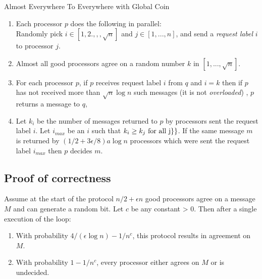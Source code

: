 \documentclass{sig-alternate}
\begin{document}
\begin{algorithm}

\caption{Almost Everywhere To Everywhere with Global Coin}

\begin{enumerate}

\item
Each processor $p$ does the following in parallel:  \\
Randomly pick  $i\in [1,2.,, ,\sqrt{n} ]$ and $j \in [1,...,n]$,  and send  a {\it request label} $i$ to processor $j$.
\item \label{random}
Almost all good processors agree on a random number  $k$ in $[1,...,\sqrt{n}]$.

\item \label{received}
For each processor $p$, if $p$ receives request label $i$ from $q$  and $i=k$ then  
if $p$ has not received more than $ \sqrt{n}\log n$ such messages (it is not {\it overloaded}) ,  
$p$ returns  a message to $q$, 
\item \label{majority}
Let  $k_i$ be the number of messages returned to $p$ by processors sent the request label $i$. Let $i_{max}$ be an $i$ such that  $k_i \geq k_j  \hbox{ for all j}\} \}$. If  the same message $m$  is  returned by $ (1/2 + 3\epsilon/8) a \log n  $  processors which  were sent the request label $i_{max}$ then $p$ decides  $m$.


\end{enumerate}
\end{algorithm}

\subsection{Proof of correctness}

\begin{lemma}\label{singleLoop}
Assume at the start of the protocol $n/2 + \epsilon n$ good processors agree on a message $M$ and can generate a  random bit.  Let $c$ be any constant > 0. Then after a single execution of the loop:
\begin{enumerate}
\item
With probability $4/(\epsilon \log n)-1/n^c$, this protocol results in agreement on $M$. 
\item
With probability $1-1/n^c$, every processor either agrees on $M$ or is undecided.
\end{enumerate}
\end{lemma} 
\end{document}
